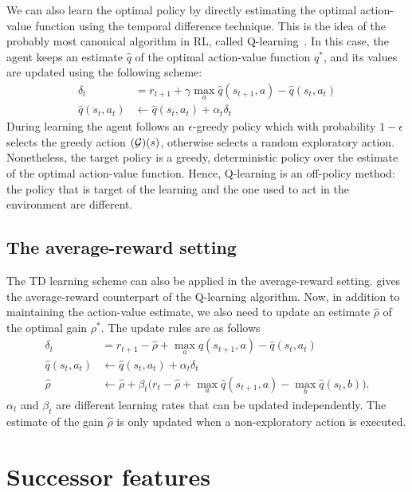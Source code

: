 We can also learn the optimal policy by directly estimating the optimal action-value function using the temporal difference technique. This is the idea of the probably most canonical algorithm in RL, called Q-learning~\citep{Watkins1992}. In this case, the agent keeps an estimate $\widehat q$ of the optimal action-value function $q^*$, and its values are updated using the following scheme:
\begin{align}
  \delta_t &= r_{t+1} + \gamma \max_a \widehat  q(s_{t+1}, a) - \widehat q(s_t, a_t) \\
  \widehat q(s_t, a_t) &\leftarrow \widehat q(s_t, a_t) + \alpha_t \delta_t
  \label{eq:qlearning}
\end{align}
During learning the agent follows an $\epsilon$-greedy policy which with probability $1-\epsilon$ selects the greedy action $(\mathcal{G})(s)$, otherwise selects a random exploratory action.
Nonetheless, the target policy is a greedy, deterministic policy over the estimate of the optimal action-value function. Hence, Q-learning is an off-policy method: the policy that is target of the learning and the one used to act in the environment are different.

\subsection{The average-reward setting}

The TD learning scheme can also be applied in the average-reward setting. \citet{Mahadevan1996} gives the average-reward counterpart of the Q-learning algorithm. Now, in addition to maintaining the action-value estimate, we also need to update an estimate $\widehat\rho$ of the optimal gain $\rho^*$. The update rules are as follows
\begin{align}
  \delta_t &= r_{t+1} - \widehat\rho +  \max_a \widehat q(s_{t+1}, a)  - \widehat q(s_t, a_t) \\
  \widehat q(s_t, a_t) &\leftarrow \widehat q(s_t, a_t) + \alpha_t \delta_t \\
  \widehat \rho &\leftarrow \widehat\rho + \beta_t \big(r_t - \widehat\rho + \max_a \widehat q(s_{t+1}, a) - \max_b \widehat q (s_t, b) \big).
  \label{eq:rlearning}
\end{align}
$\alpha_t$ and $\beta_t$ are different learning rates that can be updated independently. The estimate of the gain $\widehat\rho$ is only updated when a non-exploratory action is executed.

\section{Successor features} 
\label{section:successor_features}


